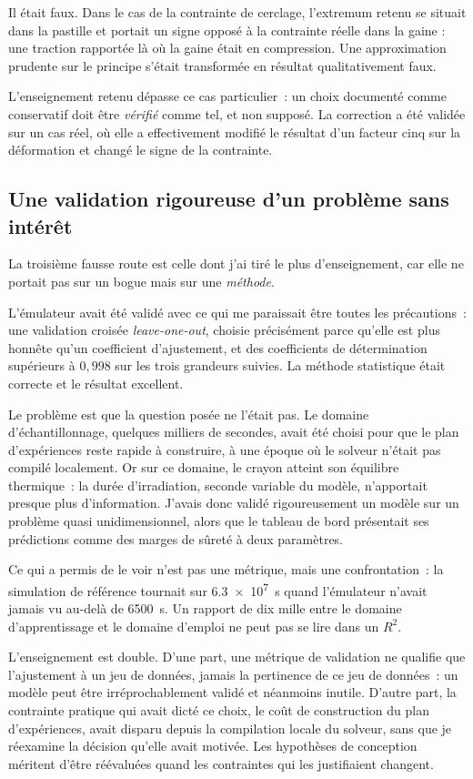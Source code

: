 \documentclass[12pt,a4paper,french]{report}
\begin{document}
Il était faux. Dans le cas de la contrainte de cerclage, l'extremum retenu se
situait dans la pastille et portait un signe opposé à la contrainte réelle dans
la gaine : une traction rapportée là où la gaine était en compression. Une
approximation prudente sur le principe s'était transformée en résultat
qualitativement faux.

L'enseignement retenu dépasse ce cas particulier~: un choix documenté comme
conservatif doit être \emph{vérifié} comme tel, et non supposé. La correction a
été validée sur un cas réel, où elle a effectivement modifié le résultat d'un
facteur cinq sur la déformation et changé le signe de la contrainte.

\subsection{Une validation rigoureuse d'un problème sans intérêt}

La troisième fausse route est celle dont j'ai tiré le plus d'enseignement, car
elle ne portait pas sur un bogue mais sur une \emph{méthode}.

L'émulateur avait été validé avec ce qui me paraissait être toutes les
précautions~: une validation croisée \textit{leave-one-out}, choisie
précisément parce qu'elle est plus honnête qu'un coefficient d'ajustement, et
des coefficients de détermination supérieurs à $0{,}998$ sur les trois
grandeurs suivies. La méthode statistique était correcte et le résultat
excellent.

Le problème est que la question posée ne l'était pas. Le domaine
d'échantillonnage, quelques milliers de secondes, avait été choisi pour que
le plan d'expériences reste rapide à construire, à une époque où le solveur
n'était pas compilé localement. Or sur ce domaine, le crayon atteint son
équilibre thermique~: la durée d'irradiation, seconde variable du modèle,
n'apportait presque plus d'information. J'avais donc validé rigoureusement un
modèle sur un problème quasi unidimensionnel, alors que le tableau de bord
présentait ses prédictions comme des marges de sûreté à deux paramètres.

Ce qui a permis de le voir n'est pas une métrique, mais une confrontation~: la
simulation de référence tournait sur \SI{6.3e7}{\second} quand l'émulateur
n'avait jamais vu au-delà de \SI{6500}{\second}. Un rapport de dix mille entre
le domaine d'apprentissage et le domaine d'emploi ne peut pas se lire dans un
$R^2$.

L'enseignement est double. D'une part, une métrique de validation ne qualifie
que l'ajustement à un jeu de données, jamais la pertinence de ce jeu de
données~: un modèle peut être irréprochablement validé et néanmoins inutile.
D'autre part, la contrainte pratique qui avait dicté ce choix, le coût de
construction du plan d'expériences, avait disparu depuis la compilation locale
du solveur, sans que je réexamine la décision qu'elle avait motivée. Les
hypothèses de conception méritent d'être réévaluées quand les contraintes qui
les justifiaient changent.
\end{document}
